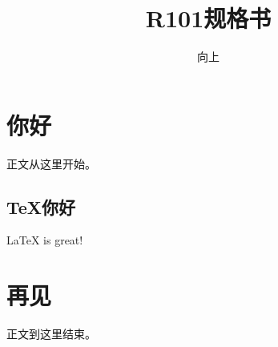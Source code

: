 \documentclass{cgdartcn}
\begin{document}
	\title{R101规格书}                %
	\subtitle{}             %
	
	\author{向上}               %
	\maketitle
	
	\begin{abstract}         %
	\end{abstract}
	
	\begin{revisions} %
	\end{revisions}
	
	\frontmatter            %
	
	\mainmatter
	\section{你好}
	正文从这里开始。
	
	\subsection{\TeX 你好}
	\LaTeX\cite{oetiker1995not} is great!
	\section{再见}
	正文到这里结束。
	
	\appendix
	
	
	\backmatter
\end{document}
